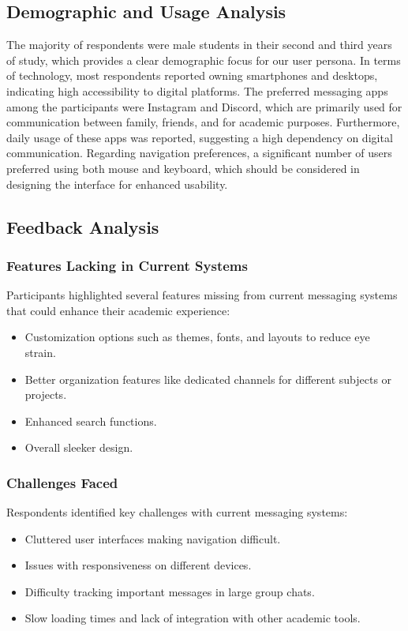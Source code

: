 \documentclass[12pt,a4paper]{article}
\begin{document}
\subsection*{Demographic and Usage Analysis}
The majority of respondents were male students in their second and third years of study, which provides a clear demographic focus for our user persona. In terms of technology, most respondents reported owning smartphones and desktops, indicating high accessibility to digital platforms. The preferred messaging apps among the participants were Instagram and Discord, which are primarily used for communication between family, friends, and for academic purposes. Furthermore, daily usage of these apps was reported, suggesting a high dependency on digital communication. Regarding navigation preferences, a significant number of users preferred using both mouse and keyboard, which should be considered in designing the interface for enhanced usability.

\subsection*{Feedback Analysis}
\subsubsection*{Features Lacking in Current Systems}
Participants highlighted several features missing from current messaging systems that could enhance their academic experience:
\begin{itemize}
    \item Customization options such as themes, fonts, and layouts to reduce eye strain.
    \item Better organization features like dedicated channels for different subjects or projects.
    \item Enhanced search functions.
    \item Overall sleeker design.
\end{itemize}

\subsubsection*{Challenges Faced}
Respondents identified key challenges with current messaging systems:
\begin{itemize}
    \item Cluttered user interfaces making navigation difficult.
    \item Issues with responsiveness on different devices.
    \item Difficulty tracking important messages in large group chats.
    \item Slow loading times and lack of integration with other academic tools.
\end{itemize}
\end{document}
